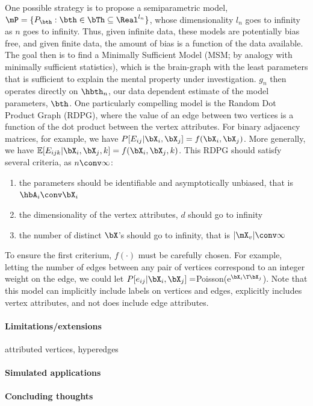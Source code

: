 One possible strategy is to propose a semiparametric model, $\mP=\{P_{\bth} : \bth \in \bTh \subseteq \Real^{l_n}\}$, whose dimensionality $l_n$ goes to infinity as $n$ goes to infinity.  Thus, given infinite data, these models are potentially bias free, and given finite data, the amount of bias is a function of the data available.  The goal then is to find a Minimally Sufficient Model (MSM; by analogy with minimally sufficient statistics), which is the brain-graph with the least parameters that is sufficient to explain the mental property under investigation.  $g_n$ then operates directly on $\hbth_n$, our data dependent estimate of the model parameters, $\bth$.  One particularly compelling model is the Random Dot Product Graph (RDPG), where the value of an edge between two vertices is a function of the dot product between the vertex attributes.  For binary adjacency matrices, for example, we have $P[E_{ij} | \bX_i, \bX_j]=f(\bX_i, \bX_j)$.  More generally, we have $\mathbb{E}[E_{ijk} | \bX_i, \bX_j, k]= f(\bX_i, \bX_j, k)$.  This RDPG should satisfy several criteria, as $n \conv \infty$:

\begin{enumerate}
	\item the parameters should be identifiable and asymptotically unbiased, that is $\hbA_i \conv \bX_i$
	\item the dimensionality of the vertex attributes, $d$ should go to infinity
	\item the number of distinct $\bX$'s should go to infinity, that is $|\mX_v| \conv \infty$
\end{enumerate}

To ensure the first criterium, $f(\cdot)$ must be carefully chosen.  For example, letting the number of edges between any pair of vertices correspond to an integer weight on the edge, we could let $P[e_{ij} | \bX_i,\bX_j]=$Poisson(e$^{\bX_i\T \bX_j}$).  Note that this model can implicitly include labels on vertices and edges, explicitly includes vertex attributes, and not does include edge attributes.  


\paragraph{Limitations/extensions}

attributed vertices, hyperedges

\paragraph{Simulated applications}

\paragraph{Concluding thoughts}






